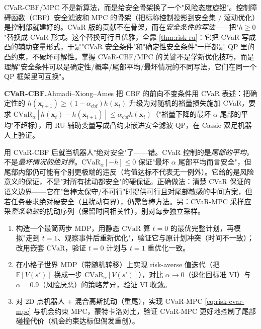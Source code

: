 \begin{insight}
CVaR-CBF/MPC 不是新算法，而是给安全骨架换了一个"风险态度旋钮"。控制障碍函数（CBF）安全滤波和 MPC 的骨架（把标称控制投影到安全集 / 滚动优化）是控制部就建好的。CVaR 版的贡献不在骨架，而在\emph{安全条件的写法}——把"$h\ge0$"替换成 CVaR 形式。这个替换可行且优雅，全靠 \cref{thm:risk-ru}：它把 CVaR 写成凸的辅助变量形式，于是"CVaR 安全条件"和"确定性安全条件"一样都是 QP 里的凸约束，不破坏可解性。掌握 CVaR-CBF/MPC 的关键不是学新优化技巧，而是理解"安全条件可以是确定性/概率/尾部平均/最坏情况的不同写法，它们在同一个 QP 框架里可互换"。
\end{insight}

\begin{note}
\textbf{CVaR-CBF.}\;Ahmadi--Xiong--Ames\cite{ahmadi2021cvar} 把 CBF 的前向不变条件用 CVaR 表述：把确定性的 $h(\mathbf{x}_{t+1})\ge(1-\alpha_{\mathrm{cbf}})h(\mathbf{x}_t)$ 升级为对随机的裕量损失施加 CVaR，要求 $\mathrm{CVaR}_\alpha[h(\mathbf{x}_t)-h(\mathbf{x}_{t+1})]\le\alpha_{\mathrm{cbf}}h(\mathbf{x}_t)$（"裕量下降的最坏 $\alpha$ 尾部的平均"不超标），用 RU 辅助变量写成凸约束嵌进安全滤波 QP，在 Cassie 双足机器人上验证。
\end{note}

\begin{pitfall}
用 CVaR-CBF 后就当机器人"绝对安全"了——错。CVaR 控制的是\emph{尾部的平均}，不是\emph{最坏情况的绝对界}。$\mathrm{CVaR}_\alpha[-h]\le0$ 保证"最坏 $\alpha$ 尾部平均而言安全"，但尾部内部仍可能有个别更极端的违反（均值达标不代表无一例外）。它给的是风险意义的保证，不是"对所有扰动都安全"的硬保证。正确做法：清楚 CVaR 保证的语义边界——它在"鲁棒太保守/不可行"时提供可行且对尾部敏感的中间方案，但若任务要求绝对硬安全（且扰动有界），仍需鲁棒方法。另：CVaR-MPC 采样应采\emph{整条轨迹}的扰动序列（保留时间相关性），别对每步独立采样。
\end{pitfall}

\begin{practice}
\begin{enumerate}
  \item 构造一个最简两步 MDP，用静态 $\mathrm{CVaR}$ 算 $t=0$ 的最优完整计划，再模拟"走到 $t=1$、观察事件后重新优化"，验证它与原计划冲突（时间不一致）；改用嵌套 CVaR，验证 $t=0$ 计划与 $t=1$ 重优化一致。
  \item 在小格子世界 MDP（带随机转移）上实现 risk-averse 值迭代（把 $\mathbb{E}[V(s')]$ 换成一步 $\mathrm{CVaR}_\alpha[V(s')]$），对比 $\alpha\to0$（退化回标准 VI）与 $\alpha=0.9$（风险厌恶）的策略差异，验证 VI 收敛。
  \item 对 2D 点机器人 + 混合高斯扰动（重尾），实现 CVaR-MPC \cref{eq:risk-cvar-mpc} 与机会约束 MPC，蒙特卡洛对比，验证 CVaR-MPC 更好地控制了尾部碰撞代价（机会约束达标但偶发重创）。
\end{enumerate}
\end{practice}

